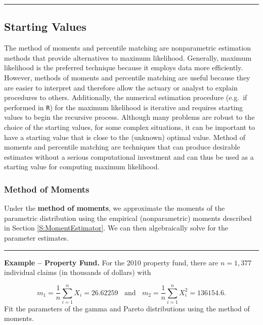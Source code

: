 \documentclass[]{book}
\theoremstyle{definition}
\theoremstyle{definition}
\theoremstyle{definition}
\theoremstyle{remark}
\begin{document}
\begin{center}\rule{0.5\linewidth}{\linethickness}\end{center}

\subsection{Starting Values}\label{starting-values}

The method of moments and percentile matching are nonparametric
estimation methods that provide alternatives to maximum likelihood.
Generally, maximum likelihood is the preferred technique because it
employs data more efficiently. However, methods of moments and
percentile matching are useful because they are easier to interpret and
therefore allow the actuary or analyst to explain procedures to others.
Additionally, the numerical estimation procedure (e.g.~if performed in
\texttt{R}) for the maximum likelihood is iterative and requires
starting values to begin the recursive process. Although many problems
are robust to the choice of the starting values, for some complex
situations, it can be important to have a starting value that is close
to the (unknown) optimal value. Method of moments and percentile
matching are techniques that can produce desirable estimates without a
serious computational investment and can thus be used as a starting
value for computing maximum likelihood.

\subsubsection{Method of Moments}\label{method-of-moments}

Under the \textbf{method of moments}, we approximate the moments of the
parametric distribution using the empirical (nonparametric) moments
described in Section \ref{S:MomentEstimator}. We can then algebraically
solve for the parameter estimates.

\begin{center}\rule{0.5\linewidth}{\linethickness}\end{center}

\textbf{Example -- Property Fund.} For the 2010 property fund, there are
\(n=1,377\) individual claims (in thousands of dollars) with

\[m_1 = \frac{1}{n} \sum_{i=1}^n X_i = 26.62259 \ \ \ \
\text{and} \ \ \ \
 m_2 = \frac{1}{n} \sum_{i=1}^n X_i^2 = 136154.6 .\] Fit the parameters
of the gamma and Pareto distributions using the method of moments.
\end{document}
